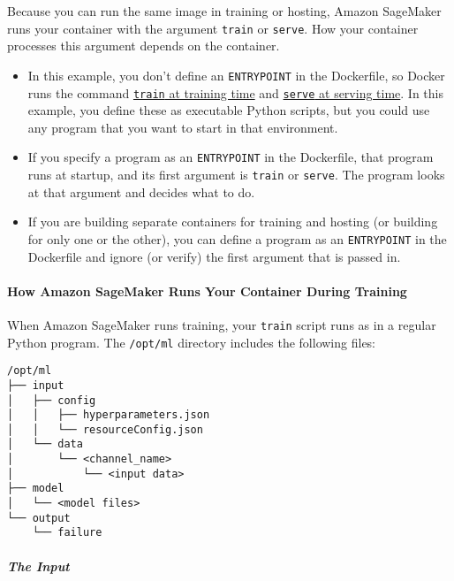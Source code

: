 \documentclass[11pt]{article}
\providecommand{\tightlist}{%
      \setlength{\itemsep}{0pt}\setlength{\parskip}{0pt}}
\begin{document}
Because you can run the same image in training or hosting, Amazon
SageMaker runs your container with the argument \texttt{train} or
\texttt{serve}. How your container processes this argument depends on
the container.

\begin{itemize}
\tightlist
\item
  In this example, you don't define an \texttt{ENTRYPOINT} in the
  Dockerfile, so Docker runs the command
  \href{https://docs.aws.amazon.com/sagemaker/latest/dg/your-algorithms-training-algo.html}{\texttt{train}
  at training time} and
  \href{https://docs.aws.amazon.com/sagemaker/latest/dg/your-algorithms-inference-code.html}{\texttt{serve}
  at serving time}. In this example, you define these as executable
  Python scripts, but you could use any program that you want to start
  in that environment.
\item
  If you specify a program as an \texttt{ENTRYPOINT} in the Dockerfile,
  that program runs at startup, and its first argument is \texttt{train}
  or \texttt{serve}. The program looks at that argument and decides what
  to do.
\item
  If you are building separate containers for training and hosting (or
  building for only one or the other), you can define a program as an
  \texttt{ENTRYPOINT} in the Dockerfile and ignore (or verify) the first
  argument that is passed in.
\end{itemize}

\paragraph{How Amazon SageMaker Runs Your Container During
Training}\label{how-amazon-sagemaker-runs-your-container-during-training}

When Amazon SageMaker runs training, your \texttt{train} script runs as
in a regular Python program. The \texttt{/opt/ml} directory includes the
following files:

\begin{verbatim}
/opt/ml
├── input
│   ├── config
│   │   ├── hyperparameters.json
│   │   └── resourceConfig.json
│   └── data
│       └── <channel_name>
│           └── <input data>
├── model
│   └── <model files>
└── output
    └── failure
\end{verbatim}

\subparagraph{The Input}\label{the-input}
\end{document}
